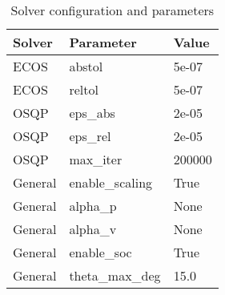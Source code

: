 \begin{table}[t]
\centering
\begin{tabular}{lll}
\toprule
Solver & Parameter & Value \\
\midrule
ECOS & abstol & 5e-07 \\
ECOS & reltol & 5e-07 \\
OSQP & eps_abs & 2e-05 \\
OSQP & eps_rel & 2e-05 \\
OSQP & max_iter & 200000 \\
General & enable_scaling & True \\
General & alpha_p & None \\
General & alpha_v & None \\
General & enable_soc & True \\
General & theta_max_deg & 15.0 \\
\bottomrule
\end{tabular}
\caption{Solver configuration and parameters}
\label{tab:solver_settings}
\end{table}
